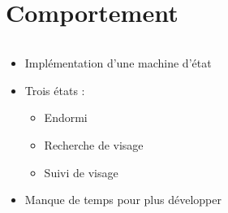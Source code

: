 \section{Comportement}
\begin{frame}
  \begin{columns}[T]
    \begin{column}{.5\textwidth}
      \begin{itemize}
        \item Implémentation d'une machine d'état
        \item Trois états :
          \begin{itemize}
            \item Endormi
            \item Recherche de visage
            \item Suivi de visage
          \end{itemize}
        \item Manque de temps pour plus développer
      \end{itemize}
    \end{column}
    \begin{column}{.5\textwidth}
      \begin{figure}
        
      \end{figure}
    \end{column}
 \end{columns}
\end{frame}

